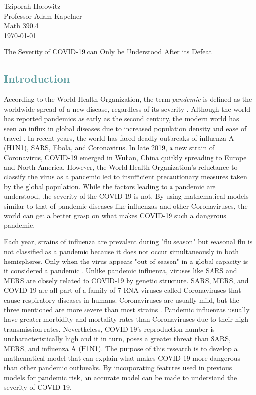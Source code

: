 \documentclass[12pt]{article}
\begin{document}
\raggedright


	Tziporah Horowitz \\ 
	Professor Adam Kapelner \\ 
	Math 390.4 \\ 
	\today 
	\vspace{15 pt}

\centerline{The Severity of COVID-19 can Only be Understood After its Defeat}
    
\setlength{\parindent}{.5in}


\textcolor{CadetBlue}{\section{Introduction}}

According to the World Health Organization, the term \emph{pandemic} is defined as the worldwide spread of a new disease, regardless of its severity \cite{pandemicDef}. Although the world has reported pandemics as early as the second century, the modern world has seen an influx in global diseases due to increased population density and ease of travel \cite{panHist}. In recent years, the world has faced deadly outbreaks of influenza A (H1N1), SARS, Ebola, and Coronavirus. In late 2019, a new strain of Coronavirus, COVID-19 emerged in Wuhan, China quickly spreading to Europe and North America. However, the World Health Organization's reluctance to classify the virus as a pandemic led to insufficient precautionary measures taken by the global population. While the factors leading to a pandemic are understood, the severity of the COVID-19 is not. By using mathematical models similar to that of pandemic diseases like influenzas and other Coronaviruses, the world can get a better grasp on what makes COVID-19 such a dangerous pandemic. 

Each year, strains of influenza are prevalent during "flu season" but seasonal flu is not classified as a pandemic because it does not occur simultaneously in both hemispheres. Only when the virus appears "out of season" in a global capacity is it considered a pandemic \cite{kelly}. Unlike pandemic influenza, viruses like SARS and MERS are closely related to COVID-19 by genetic structure. SARS, MERS, and COVID-19 are all part of a family of $7$ RNA viruses called Coronaviruses that cause respiratory diseases in humans. Coronaviruses are usually mild, but the three mentioned are more severe than most strains \cite{coronaviruses}. Pandemic influenzas usually have greater morbidity and mortality rates than Coronaviruses due to their high transmission rates. Nevertheless, COVID-19's reproduction number is uncharacteristically high and it in turn, poses a greater threat than SARS, MERS, and influenza A (H1N1). The purpose of this research is to develop a mathematical model that can explain what makes COVID-19 more dangerous than other pandemic outbreaks. By incorporating features used in previous models for pandemic risk, an accurate model can be made to understand the severity of COVID-19.
\end{document}
